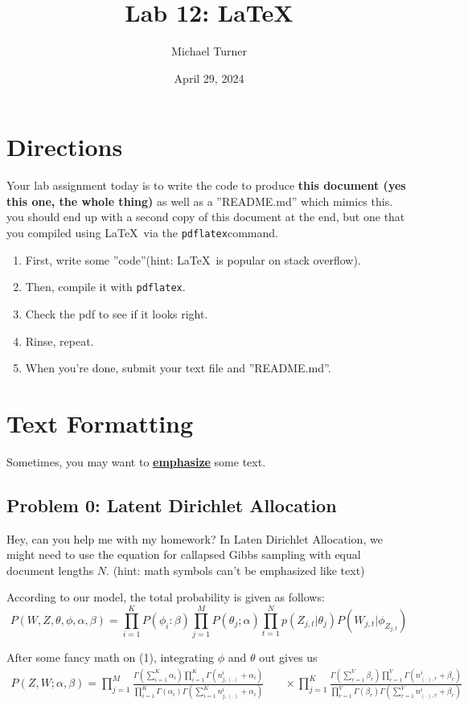 \documentclass{article}
\title{Lab 12: \LaTeX}
\author{Michael Turner}
\date{April 29, 2024}
\begin{document}
\maketitle
\section*{Directions}
Your lab assignment today is to write the code to produce \textbf{this document (yes this one, the whole thing)} as well as a ''README.md'' which mimics this. you should end up with a second copy of this document at the end, but one that you compiled using \LaTeX\ via the \texttt{pdflatex}command.

\begin{enumerate}
	\item First, write some ''code''(hint: \LaTeX\ is popular on stack overflow).
	\item Then, compile it with \texttt{pdflatex}.
	\item Check the pdf to see if it looks right.
	\item Rinse, repeat.
	\item When you're done, submit your text file and ''README.md''.
\end{enumerate}

\section*{Text Formatting}
Sometimes, you may want to \underline{\textbf{emphasize}} some text.

\subsection*{Problem 0: Latent Dirichlet Allocation}
Hey, can you help me with my homework? In Laten Dirichlet Allocation, we might need to use the equation for callapsed Gibbs sampling with equal document lengths $N$. (hint: math symbols can't be emphasized like text)

According to our model, the total probability is given as follows:
\begin{equation}
	P(W , Z, \theta, \phi, \alpha, \beta) = \prod_{i=1}^{K} P (\phi_i: \beta) \prod_{j=1}^{M} P (\theta_j ; \alpha) \prod_{t=1}^{N} p (Z_{j,t}|\theta_j )P (W_{j,t}|\phi_{Z_{j,t}} )
\end{equation}

After some fancy math on (1), integrating $\phi$ and $\theta$ out gives us
\begin{equation}
\begin{aligned}
	P (Z, W ; \alpha, \beta) = \prod_{j=1}^{M} \frac{\Gamma(\sum_{i=1}^{K} \alpha_i) \prod_{i=1}^{K} \Gamma(n_{j,(.)}^i + \alpha_i)}
	{ \prod_{i=1}^{K} \Gamma(\alpha_i) \Gamma(\sum_{i=1}^{K} n_{j,(.)}^i + \alpha_i)}
	&\quad \times \prod_{j=1}^{K} \frac{ \Gamma(\sum_{r=1}^{V} \beta_r) \prod_{r=1}^{V} \Gamma(n_{(.),r}^i + \beta_r)}
	{ \prod_{r=1}^{V} \Gamma(\beta_r) \Gamma(\sum_{r=1}^{V} n_{(.),r}^i +\beta_r)}
\end{aligned}
\end{equation}
\end{document}
